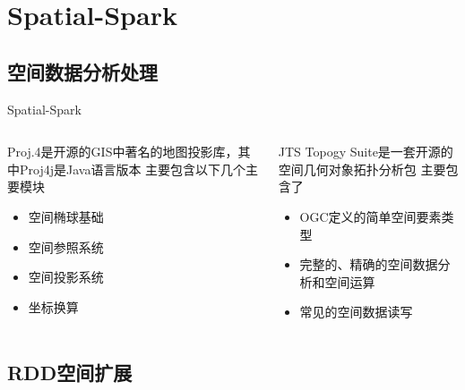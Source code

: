 \section{Spatial-Spark}

\subsection{空间数据分析处理}

\begin{frame}[c]{Spatial-Spark}
    \begin{columns}
        \begin{column}{0.5 \textwidth}
            Proj.4是开源的GIS中著名的地图投影库，其中Proj4j是Java语言版本
            主要包含以下几个主要模块

            \begin{itemize}
                \item 空间椭球基础
                \item 空间参照系统
                \item 空间投影系统
                \item 坐标换算
            \end{itemize}
        \end{column}
        \pause
        \begin{column}{0.5 \textwidth}
            JTS Topogy Suite是一套开源的空间几何对象拓扑分析包
            主要包含了

            \begin{itemize}
                \item OGC定义的简单空间要素类型
                \item 完整的、精确的空间数据分析和空间运算
                \item 常见的空间数据读写
            \end{itemize}
        \end{column}
    \end{columns}
\end{frame}

\subsection{RDD空间扩展}

